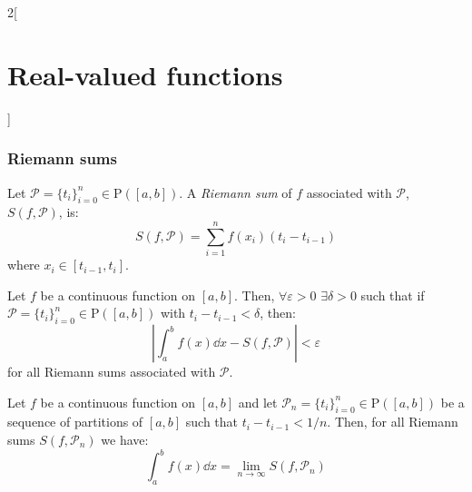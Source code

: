 \documentclass[../../../main.tex]{subfiles}
\begin{document}
\begin{multicols}{2}[\section{Real-valued functions}]
  \subsubsection{Riemann sums}
  \begin{definition}
    Let $\mathcal{P}=\{t_i\}_{i=0}^n\in\mathrm{P}([a,b])$. A \emph{Riemann sum} of $f$ associated with $\mathcal{P}$, $S(f,\mathcal{P})$, is: $$S(f,\mathcal{P})=\sum_{i=1}^nf(x_i)(t_i-t_{i-1})$$ where $x_i\in[t_{i-1},t_i]$.
  \end{definition}
  \begin{theorem}
    Let $f$ be a continuous function on $[a,b]$. Then, $\forall\varepsilon>0$ $\exists\delta>0$ such that if $\mathcal{P}=\{t_i\}_{i=0}^n\in\mathrm{P}([a,b])$ with $t_i-t_{i-1}<\delta$, then: $$\left|\int_a^bf(x)\dd{x}-S(f,\mathcal{P})\right|<\varepsilon$$ for all Riemann sums associated with $\mathcal{P}$.
  \end{theorem}
  \begin{corollary}
    Let $f$ be a continuous function on $[a,b]$ and let $\mathcal{P}_n=\{t_i\}_{i=0}^n\in\mathrm{P}([a,b])$ be a sequence of partitions of $[a,b]$ such that $t_i-t_{i-1}<1/n$. Then, for all Riemann sums $S(f,\mathcal{P}_n)$ we have: $$\int_a^bf(x)\dd{x}=\lim_{n\to\infty}S(f,\mathcal{P}_n)$$
  \end{corollary}

\end{multicols}
\end{document}
